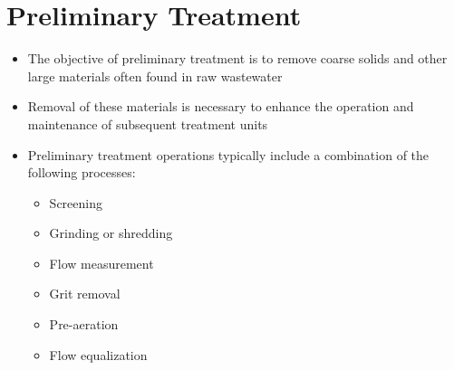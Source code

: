 



\chapter{Preliminary Treatment}









			\begin{itemize}
				\item The objective of preliminary treatment is to remove coarse solids and other large materials often found in raw wastewater
				\item Removal of these materials is necessary to enhance the operation and maintenance of subsequent treatment units\\
				\item Preliminary treatment operations typically include a combination of the following processes:
					\begin{itemize}
						\item Screening
						\item Grinding or shredding
						\item Flow measurement
						\item Grit removal
						\item Pre-aeration
						\item Flow equalization
					\end{itemize}
			\end{itemize}


